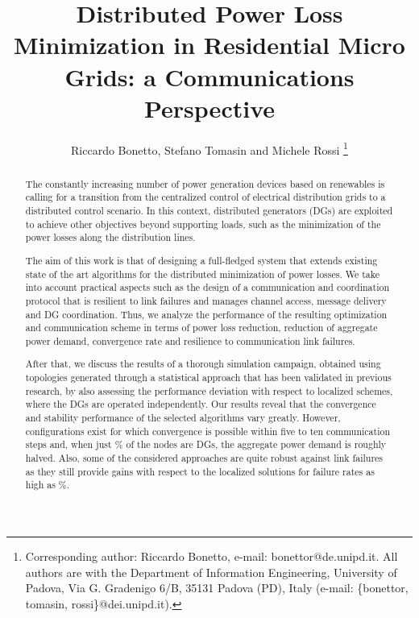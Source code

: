 \documentclass[journal]{IEEEtran}
\title{Distributed Power Loss Minimization in Residential Micro Grids: a Communications Perspective}
\author{Riccardo Bonetto, Stefano Tomasin and Michele Rossi
\thanks{Corresponding author: Riccardo Bonetto, e-mail: bonettor@de.unipd.it. All authors are with the Department of Information Engineering, University of Padova, Via G. Gradenigo 6/B, 35131 Padova (PD), Italy (e-mail: \{bonettor, tomasin, rossi\}@dei.unipd.it).}}
\begin{document}
\maketitle


\begin{abstract}
The constantly increasing number of power generation devices based on renewables is calling for a transition from the centralized control of electrical distribution grids to a distributed control scenario. In this context, distributed generators (DGs) are exploited to achieve other objectives beyond supporting loads, such as the minimization of the power losses along the distribution lines.

The aim of this work is that of designing a full-fledged system that extends existing state of the art algorithms for the distributed minimization of power losses. We take into account practical aspects such as the design of a communication and coordination protocol that is resilient to link failures and manages channel access, message delivery and DG coordination. Thus, we analyze the performance of the resulting optimization and communication scheme in terms of power loss reduction, reduction of aggregate power demand, convergence rate and resilience to communication link failures.

After that, we discuss the results of a thorough simulation campaign, obtained using topologies generated through a statistical approach that has been validated in previous research, by also assessing the performance deviation with respect to localized schemes, where the DGs are operated independently. Our results reveal that the convergence and stability performance of the selected algorithms vary greatly. However, configurations exist for which convergence is possible within five to ten communication steps and, when just \% of the nodes are DGs, the aggregate power demand is roughly halved. Also, some of the considered approaches are quite robust against link failures as they still provide gains with respect to the localized solutions for failure rates as high as \%.
\end{abstract}
\end{document}
